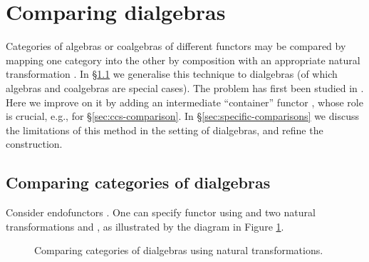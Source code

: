 \documentclass[orivec]{llncs}
\newcommand{\obj}[3]{\node (#1) [#2] {};}
\newcommand{\arr}[3]{\path[->,font=\scriptsize](#2) edge node[auto] {} (#3);}
\newcommand{\mF}[1]{\mathtt{#1}}
\newcommand{\F}{\mF{F}}
\newcommand{\G}{\mF{G}}
\newcommand{\B}{\mF{B}}
\begin{document}
\section{Comparing dialgebras}\label{sec:comparing-all}



Categories of algebras or coalgebras of different functors may be compared by mapping one category into the other by composition with an appropriate natural transformation \cite{Rut00}. In \S \ref{sec:comparing-categories} we generalise this technique to dialgebras (of which algebras and coalgebras are special cases). The problem has first been studied in \cite{Vou10}. Here we improve on it by adding an intermediate ``container'' functor , whose role is crucial, e.g., for \S \ref{sec:ccs-comparison}. In \S \ref{sec:specific-comparisons} we discuss the limitations of this method in the setting of dialgebras, and refine the construction.

\subsection{Comparing categories of dialgebras}
\label{sec:comparing-categories}


Consider  endofunctors . One can specify functor  using  and two natural transformations  and , as illustrated by the diagram in Figure \ref{fig:natural-in-set}.
\begin{figure}
\begin{center}
\end{center}
\caption{Comparing categories of dialgebras using natural transformations.}\label{fig:natural-in-set}
\end{figure}
\end{document}
